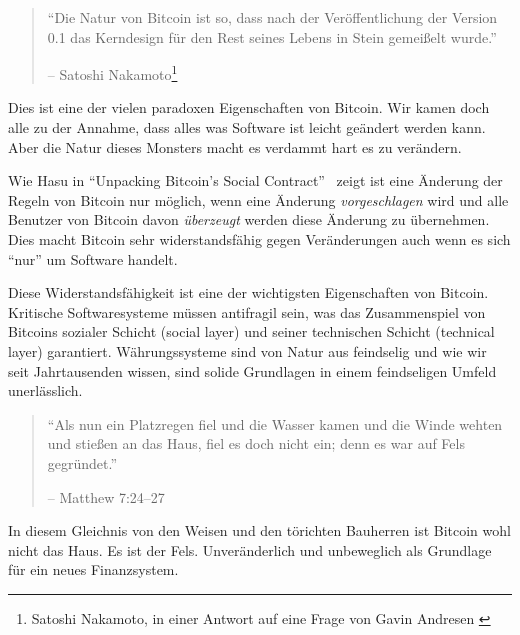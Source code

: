 \begin{quotation}\begin{samepage}
\enquote{Die Natur von Bitcoin ist so, dass nach der Veröffentlichung der
Version 0.1 das Kerndesign für den Rest seines Lebens in Stein gemeißelt wurde.}
\begin{flushright} -- Satoshi Nakamoto\footnote{Satoshi Nakamoto, in einer
Antwort auf eine Frage von Gavin Andresen \cite{satoshi-centralized-nature}}
\end{flushright}\end{samepage}\end{quotation}

Dies ist eine der vielen paradoxen Eigenschaften von Bitcoin. Wir kamen doch
alle zu der Annahme, dass alles was Software ist leicht geändert werden kann.
Aber die Natur dieses Monsters macht es verdammt hart es zu verändern.

Wie Hasu in \enquote{Unpacking Bitcoin’s Social Contract}~\cite{social-contract}
zeigt ist eine Änderung der Regeln von Bitcoin nur möglich, wenn eine Änderung
\textit{vorgeschlagen} wird und alle Benutzer von Bitcoin davon
\textit{überzeugt} werden diese Änderung zu übernehmen. Dies macht Bitcoin sehr
widerstandsfähig gegen Veränderungen auch wenn es sich \enquote{nur} um Software
handelt.

Diese Widerstandsfähigkeit ist eine der wichtigsten Eigenschaften von Bitcoin.
Kritische Softwaresysteme müssen antifragil sein, was das Zusammenspiel von
Bitcoins sozialer Schicht (social layer) und seiner technischen Schicht
(technical layer) garantiert. Währungssysteme sind von Natur aus feindselig und
wie wir seit Jahrtausenden wissen, sind solide Grundlagen in einem feindseligen
Umfeld unerlässlich.

\begin{quotation}\begin{samepage}
\enquote{Als nun ein Platzregen fiel und die Wasser kamen und die Winde wehten
und stießen an das Haus, fiel es doch nicht ein; denn es war auf Fels
gegründet.}
\begin{flushright} -- Matthew 7:24--27
\end{flushright}\end{samepage}\end{quotation}

In diesem Gleichnis von den Weisen und den törichten Bauherren ist Bitcoin wohl
nicht das Haus. Es ist der Fels. Unveränderlich und unbeweglich als Grundlage
für ein neues Finanzsystem.

